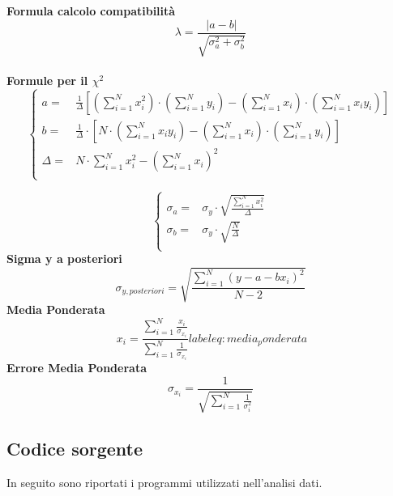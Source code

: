 \documentclass[a4paper,11pt,oneside]{article}
\begin{document}
\textbf{Formula calcolo compatibilità}\\
\begin{equation*}
    \lambda=\frac{\left|a-b\right|}{\sqrt{\sigma^{2}_{a}+\sigma^{2}_{b}}}
\end{equation*}\\

\textbf{Formule per il ${\chi}^2$}
\begin{equation*}
        \begin{cases}
    a=&\frac{1}{\Delta}[(\sum\limits_{i=1}^{N}{x_{i}^{2}})\cdot(\sum\limits_{i=1}^{N}{y_{i}})-(\sum\limits_{i=1}^{N}{x_{i}})\cdot(\sum\limits_{i=1}^{N}{x_{i}y_{i}})] \\ 
    b=&\frac{1}{\Delta }\cdot \left [N\cdot \left ( \sum\limits_{i=1}^{N}x_i y_i \right )-\left ( \sum\limits_{i=1}^{N}x_i \right )\cdot \left ( \sum\limits_{i=1}^{N}y_i \right )  \right ]\\
    \Delta=& N\cdot \sum\limits_{i=1}^{N} x_i^{2} - \left ( \sum\limits_{i=1}^{N}x_i \right )^{2}\\

    \end{cases}
\end{equation*}

\begin{equation*}
    \begin{cases}
    \sigma_{a}=&\sigma_{y}\cdot\sqrt{\frac{\sum_{i=1}^{N}{x_{i}^{2}}}{\Delta}} \\
    \sigma_{b}=&\sigma_y\cdot \sqrt{\frac{N}{\Delta }}\\
    \end{cases}
\end{equation*}
\textbf{Sigma y a posteriori}
\begin{equation*}
    \sigma_{y, posteriori}=\sqrt{\frac{\sum_{i=1}^{N}(y-a-bx_{i})^{2}}{N-2}}\label{eq:y_posteriori}
\end{equation*}
\textbf{Media Ponderata}
\begin{equation*}\
    x_i=\frac{\sum_{i=1}^{N}\frac{x_i}{\sigma_{x_i}}}{\sum_{i=1}^{N}\frac{1}{\sigma_{x_i}}}label{eq:media_ponderata}
\end{equation*}
\textbf{Errore Media Ponderata}
\begin{equation*}
     \sigma_x_i=\frac{1}{\sqrt{\sum_{i=1}^{N}\frac{1}{\sigma_{i}^{2}}}}\label{eq:errore_media_pond}
\end{equation*}
   

\subsection{Codice sorgente}
In seguito sono riportati i programmi utilizzati nell'analisi dati.
\end{document}
